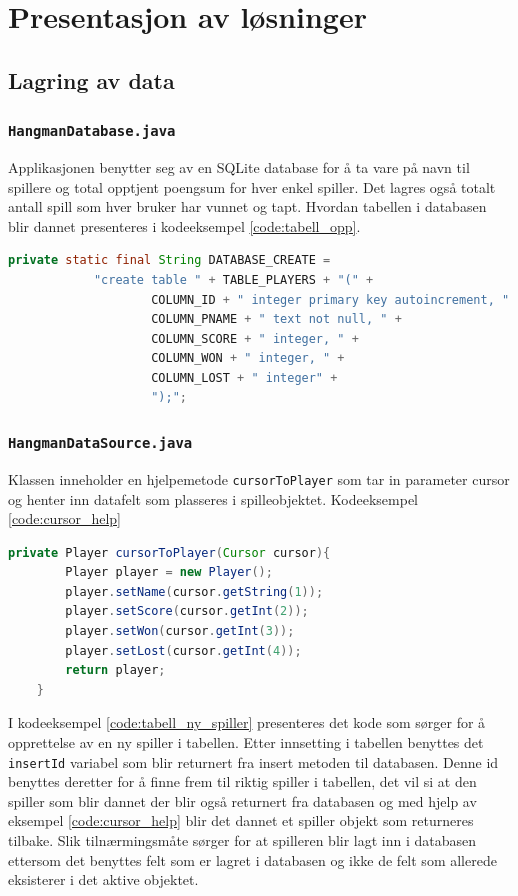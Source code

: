 \chapter{Presentasjon av løsninger}

\section{Lagring av data}
\subsection{\texttt{HangmanDatabase.java}}
Applikasjonen benytter seg av en SQLite database for å ta vare på navn til spillere og total opptjent poengsum for hver enkel spiller. Det lagres også totalt antall spill som hver bruker har vunnet og tapt. Hvordan tabellen i databasen blir dannet presenteres i kodeeksempel \ref{code:tabell_opp}.

\begin{lstlisting}[language=Java, caption=Script for opprettelse av tabell, label=code:tabell_opp]
 private static final String DATABASE_CREATE =
            "create table " + TABLE_PLAYERS + "(" +
                    COLUMN_ID + " integer primary key autoincrement, " +
                    COLUMN_PNAME + " text not null, " +
                    COLUMN_SCORE + " integer, " +
                    COLUMN_WON + " integer, " +
                    COLUMN_LOST + " integer" +
                    ");";
\end{lstlisting}


\subsection{\texttt{HangmanDataSource.java}}
Klassen inneholder en hjelpemetode \texttt{cursorToPlayer} som tar in parameter cursor og henter inn datafelt som plasseres i spilleobjektet. Kodeeksempel \ref{code:cursor_help}

\begin{lstlisting}[language=Java, caption=Hjelpemetode for plasering av cursor, label=code:cursor_help]
private Player cursorToPlayer(Cursor cursor){
        Player player = new Player();
        player.setName(cursor.getString(1));
        player.setScore(cursor.getInt(2));
        player.setWon(cursor.getInt(3));
        player.setLost(cursor.getInt(4));
        return player;
    }
\end{lstlisting}

I kodeeksempel \ref{code:tabell_ny_spiller} presenteres det kode som sørger for å opprettelse av en ny spiller i tabellen. Etter innsetting i tabellen benyttes det \texttt{insertId} variabel som blir returnert fra insert metoden til databasen. Denne id benyttes deretter for å finne frem til riktig spiller i tabellen, det vil si at den spiller som blir dannet der blir også returnert fra databasen og med hjelp av eksempel \ref{code:cursor_help} blir det dannet et spiller objekt som returneres tilbake. Slik tilnærmingsmåte sørger for at spilleren blir lagt inn i databasen ettersom det benyttes felt som er lagret i databasen og ikke de felt som allerede eksisterer i det aktive objektet.


